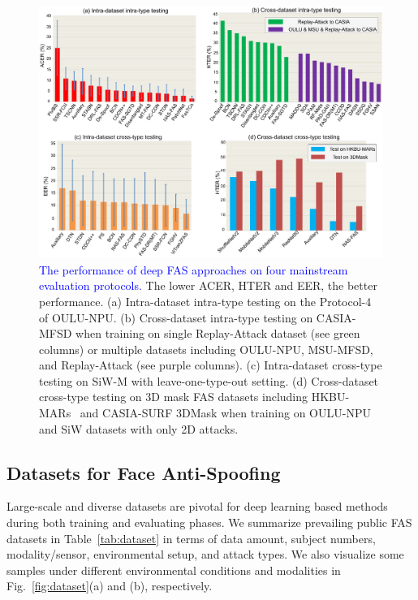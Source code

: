 \documentclass[10pt,journal,compsoc]{IEEEtran}
\begin{document}
\begin{figure}
\centering
\includegraphics[scale=0.28]{Figures/protocols.pdf}
\vspace{-1.0em}
  \caption{ 
  \textcolor{blue}{The performance of deep FAS approaches on four mainstream evaluation protocols.} The lower ACER, HTER and EER, the better performance. (a) Intra-dataset intra-type testing on the Protocol-4 of OULU-NPU. (b) Cross-dataset intra-type testing on CASIA-MFSD when training on single Replay-Attack dataset (see green columns) or multiple datasets including OULU-NPU, MSU-MFSD, and Replay-Attack (see purple columns). (c) Intra-dataset cross-type testing on SiW-M with leave-one-type-out setting. (d) Cross-dataset cross-type testing on 3D mask FAS datasets including HKBU-MARs~\cite{liu20163d} and CASIA-SURF 3DMask when training on OULU-NPU and SiW datasets with only 2D attacks. 
  }
\label{fig:protocols}
\end{figure}





\subsection{Datasets for Face Anti-Spoofing}

Large-scale and diverse datasets are pivotal for deep learning based methods during both training and evaluating phases. We summarize prevailing public FAS datasets in Table~\ref{tab:dataset} in terms of data amount, subject numbers, modality/sensor, environmental setup, and attack types. We also visualize some samples under different environmental conditions and modalities in Fig.~\ref{fig:dataset}(a) and (b), respectively. 
\end{document}
